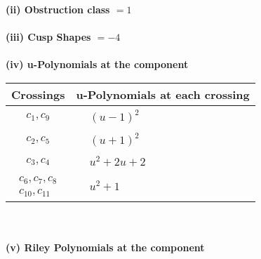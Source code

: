 \documentclass[1p]{elsarticle_modified}
\theoremstyle{definition}
\begin{document}
\flushleft \textbf{(ii) Obstruction class $= 1$}\\~\\
\flushleft \textbf{(iii) Cusp Shapes $= -4$}\\~\\
\newpage\renewcommand{\arraystretch}{1}
\flushleft \textbf{(iv) u-Polynomials at the component}\newline \\
\begin{tabular}{m{50pt}|m{274pt}}
Crossings & \hspace{64pt}u-Polynomials at each crossing \\
\hline $$\begin{aligned}c_{1},c_{9}\end{aligned}$$&$\begin{aligned}
&(u-1)^2
\end{aligned}$\\
\hline $$\begin{aligned}c_{2},c_{5}\end{aligned}$$&$\begin{aligned}
&(u+1)^2
\end{aligned}$\\
\hline $$\begin{aligned}c_{3},c_{4}\end{aligned}$$&$\begin{aligned}
&u^2+2 u+2
\end{aligned}$\\
\hline $$\begin{aligned}c_{6},c_{7},c_{8}\\c_{10},c_{11}\end{aligned}$$&$\begin{aligned}
&u^2+1
\end{aligned}$\\
\hline
\end{tabular}\\~\\
\newpage\renewcommand{\arraystretch}{1}
\flushleft \textbf{(v) Riley Polynomials at the component}\newline \\
\end{document}
